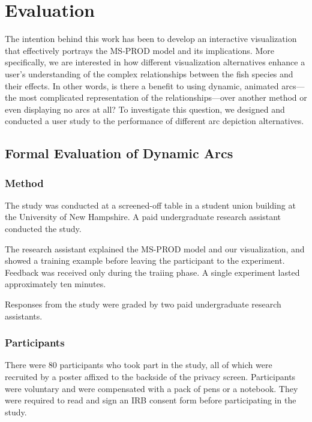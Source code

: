 \chapter{Evaluation}

The intention behind this work has been to develop an interactive visualization that effectively portrays the MS-PROD model and its implications.  More specifically, we are interested in how different visualization alternatives enhance a user's understanding of the complex relationships between the fish species and their effects.  In other words, is there a benefit to using dynamic, animated arcs---the most complicated representation of the relationships---over another method or even displaying no arcs at all?  To investigate this question, we designed and conducted a user study to the performance of different arc depiction alternatives.

\section{Formal Evaluation of Dynamic Arcs}

\subsection{Method}

The study was conducted at a screened-off table in a student union building at the University of New Hampshire.  A paid undergraduate research assistant conducted the study.

The research assistant explained the MS-PROD model and our visualization, and showed a training example before leaving the participant to the experiment.  Feedback was received only during the traiing phase.  A single experiment lasted approximately ten minutes.

Responses from the study were graded by two paid undergraduate research assistants.

\subsection{Participants}

There were 80 participants who took part in the study, all of which were recruited by a poster affixed to the backside of the privacy screen.  Participants were voluntary and were compensated with a pack of pens or a notebook.  They were required to read and sign an IRB consent form before participating in the study.

